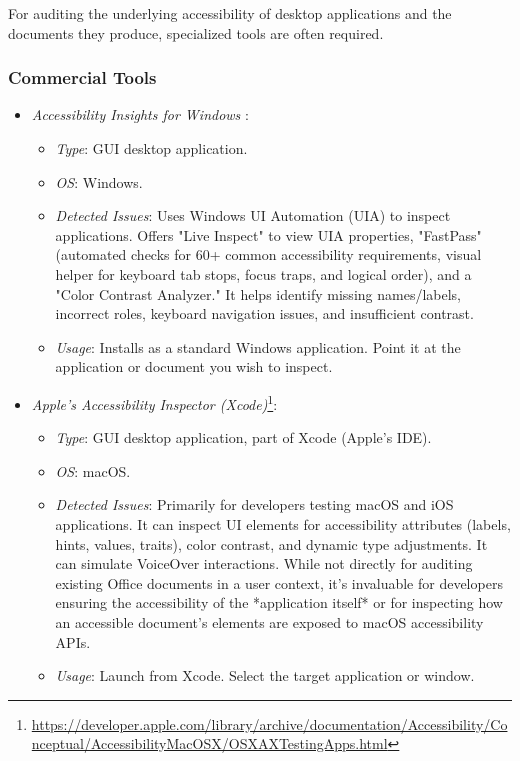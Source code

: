 For auditing the underlying accessibility of desktop applications and the documents they produce, specialized tools are often required.

\subsubsection{Commercial Tools}
\label{subsubsec:commercial-tools}
\begin{itemize}
    \item \emph{Accessibility Insights for Windows} \cite{accessibilityinsights}:
        \begin{itemize}
            \item \emph{Type}: GUI desktop application.
            \item \emph{OS}: Windows.
            \item \emph{Detected Issues}: Uses Windows UI Automation (UIA) to inspect applications. Offers "Live Inspect" to view UIA properties, "FastPass" (automated checks for 60+ common accessibility requirements, visual helper for keyboard tab stops, focus traps, and logical order), and a "Color Contrast Analyzer." It helps identify missing names/labels, incorrect roles, keyboard navigation issues, and insufficient contrast.
            \item \emph{Usage}: Installs as a standard Windows application. Point it at the application or document you wish to inspect.
        \end{itemize}
    \item \emph{Apple's Accessibility Inspector (Xcode)}\footnote{\url{https://developer.apple.com/library/archive/documentation/Accessibility/Conceptual/AccessibilityMacOSX/OSXAXTestingApps.html}}:
        \begin{itemize}
            \item \emph{Type}: GUI desktop application, part of Xcode (Apple's IDE).
            \item \emph{OS}: macOS.
            \item \emph{Detected Issues}: Primarily for developers testing macOS and iOS applications. It can inspect UI elements for accessibility attributes (labels, hints, values, traits), color contrast, and dynamic type adjustments. It can simulate VoiceOver interactions. While not directly for auditing existing Office documents in a user context, it's invaluable for developers ensuring the accessibility of the *application itself* or for inspecting how an accessible document's elements are exposed to macOS accessibility APIs.
            \item \emph{Usage}: Launch from Xcode. Select the target application or window.
        \end{itemize}
\end{itemize}

